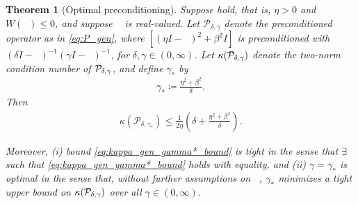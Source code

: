 \documentclass[a4paper,10pt]{article}
\newtheorem{theorem}{Theorem}
\DeclareMathOperator{\cL}{\widehat{\mathcal{L}}}
\begin{document}
%
\begin{theorem}[Optimal preconditioning]\label{th:cond}
Suppose  hold, that is, $\eta > 0$ and $W(\cL) \leq 0$,
and suppose $\cL$ is real-valued. Let $\mathcal{P}_{\delta,\gamma}$ denote
the preconditioned operator as in \eqref{eq:P_gen},
where $[(\eta I  - \cL)^2 + \beta^2 I]$ is preconditioned with
$(\delta I - \cL)^{-1} (\gamma I - \cL)^{-1}$, for $\delta, \gamma \in (0, \infty)$.
%
Let $\kappa({\cal P}_{\delta, \gamma})$ denote the two-norm condition number of ${\cal P}_{\delta,\gamma}$,
and define $\gamma_*$ by
\begin{align} \label{eq:gamma*_gen}
\gamma_* \coloneqq \frac{\eta^2+\beta^2}{\delta}.
\end{align}
Then
\begin{align} \label{eq:kappa_gen_gamma*_bound}
\kappa(\mathcal{P}_{\delta, \gamma_*}) \leq \frac{1}{2 \eta} \left( \delta + \frac{\eta^2 + \beta^2}{\delta} \right).
\end{align}

Moreover, (i) bound \eqref{eq:kappa_gen_gamma*_bound} is tight in the sense that $\exists$ $\cL$
such that \eqref{eq:kappa_gen_gamma*_bound} holds with equality, and (ii) $\gamma = \gamma_*$ is optimal
in the sense that, without further assumptions on $\cL$, $\gamma_*$ minimizes a tight
upper bound on $\kappa({\cal P}_{\delta, \gamma})$ over all $\gamma \in (0, \infty)$.
\end{theorem}
%
\end{document}
